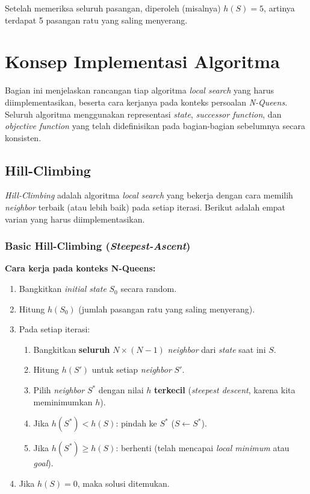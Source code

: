 \documentclass[12pt,a4paper]{article}
\begin{document}
Setelah memeriksa seluruh pasangan, diperoleh (misalnya) $h(S) = 5$, artinya terdapat 5 pasangan ratu yang saling menyerang.

\section{Konsep Implementasi Algoritma}
\label{sec:implementasi}

Bagian ini menjelaskan rancangan tiap algoritma \textit{local search} yang harus diimplementasikan, beserta cara kerjanya pada konteks persoalan \textit{N-Queens}. Seluruh algoritma menggunakan representasi \textit{state}, \textit{successor function}, dan \textit{objective function} yang telah didefinisikan pada bagian-bagian sebelumnya secara konsisten.

\subsection{Hill-Climbing}
\label{subsec:hill-climbing}

\textit{Hill-Climbing} adalah algoritma \textit{local search} yang bekerja dengan cara memilih \textit{neighbor} terbaik (atau lebih baik) pada setiap iterasi. Berikut adalah empat varian yang harus diimplementasikan.

\subsubsection{Basic Hill-Climbing (\textit{Steepest-Ascent})}
\label{subsubsec:basic-hc}

\textbf{Cara kerja pada konteks N-Queens:}
\begin{enumerate}[label=\arabic*.]
    \item Bangkitkan \textit{initial state} $S_0$ secara random.
    \item Hitung $h(S_0)$ (jumlah pasangan ratu yang saling menyerang).
    \item Pada setiap iterasi:
    \begin{enumerate}[label=\alph*.]
        \item Bangkitkan \textbf{seluruh} $N \times (N-1)$ \textit{neighbor} dari \textit{state} saat ini $S$.
        \item Hitung $h(S')$ untuk setiap \textit{neighbor} $S'$.
        \item Pilih \textit{neighbor} $S^*$ dengan nilai $h$ \textbf{terkecil} (\textit{steepest descent}, karena kita meminimumkan $h$).
        \item Jika $h(S^*) < h(S)$: pindah ke $S^* $ ($S \leftarrow S^*$).
        \item Jika $h(S^*) \geq h(S)$: berhenti (telah mencapai \textit{local minimum} atau \textit{goal}).
    \end{enumerate}
    \item Jika $h(S) = 0$, maka solusi ditemukan.
\end{enumerate}
\end{document}
